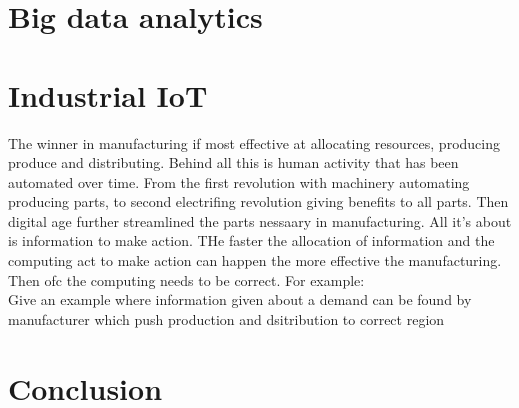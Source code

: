 \documentclass[article,a4paper]{IEEEtran}
\begin{document}
    \section{Big data analytics}
    
    \section{Industrial IoT}
    The winner in manufacturing if most effective at allocating resources, producing produce and distributing. Behind all this is human activity that has been automated over time. From the first revolution with machinery automating producing parts, to second electrifing revolution giving benefits to all parts. Then digital age further streamlined the parts nessaary in manufacturing. All it's about is information to make action. THe faster the allocation of information and the computing act to make action can happen the more effective the manufacturing. Then ofc the computing needs to be correct. For example:
    \\Give an example where information given about a demand can be found by manufacturer which push production and dsitribution to correct region\\
    
    \section{Conclusion}

\printbibliography
\end{document}
